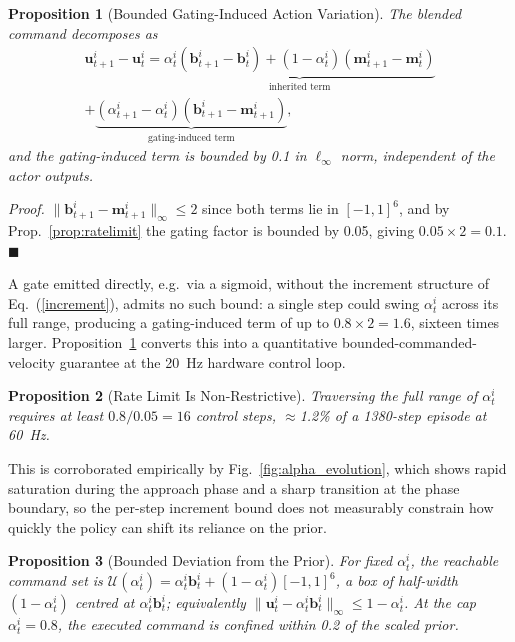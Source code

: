 \documentclass[a4paper,fleqn]{cas-dc}
\newtheorem{proposition}{Proposition}
\begin{document}
\begin{proposition}[Bounded Gating-Induced Action Variation]
\label{prop:actionvariation}
The blended command decomposes as
\begin{multline}
\mathbf{u}_{t+1}^i - \mathbf{u}_t^i = \underbrace{\alpha_t^i(\mathbf{b}_{t+1}^i - \mathbf{b}_t^i) + (1-\alpha_t^i)(\mathbf{m}_{t+1}^i - \mathbf{m}_t^i)}_{\text{inherited term}} \\
+ \underbrace{(\alpha_{t+1}^i - \alpha_t^i)(\mathbf{b}_{t+1}^i - \mathbf{m}_{t+1}^i)}_{\text{gating-induced term}},
\label{action_decomposition}
\end{multline}
and the gating-induced term is bounded by 0.1 in $\ell_\infty$ norm, independent of the actor outputs.
\end{proposition}
\textit{Proof.} $\|\mathbf{b}_{t+1}^i - \mathbf{m}_{t+1}^i\|_\infty \le 2$ since both terms lie in $[-1,1]^6$, and by Prop.~\ref{prop:ratelimit} the gating factor is bounded by 0.05, giving $0.05 \times 2 = 0.1$. $\blacksquare$

A gate emitted directly, e.g.\ via a sigmoid, without the increment structure of Eq.~(\ref{increment}), admits no such bound: a single step could swing $\alpha_t^i$ across its full range, producing a gating-induced term of up to $0.8 \times 2 = 1.6$, sixteen times larger. Proposition~\ref{prop:actionvariation} converts this into a quantitative bounded-commanded-velocity guarantee at the 20~Hz hardware control loop.

\begin{proposition}[Rate Limit Is Non-Restrictive]
\label{prop:nonrestrictive}
Traversing the full range of $\alpha_t^i$ requires at least $0.8/0.05 = 16$ control steps, $\approx$1.2\% of a 1380-step episode at 60~Hz.
\end{proposition}
This is corroborated empirically by Fig.~\ref{fig:alpha_evolution}, which shows rapid saturation during the approach phase and a sharp transition at the phase boundary, so the per-step increment bound does not measurably constrain how quickly the policy can shift its reliance on the prior.

\begin{proposition}[Bounded Deviation from the Prior]
\label{prop:boundeddeviation}
For fixed $\alpha_t^i$, the reachable command set is $\mathcal{U}(\alpha_t^i) = \alpha_t^i \mathbf{b}_t^i + (1-\alpha_t^i)[-1,1]^6$, a box of half-width $(1-\alpha_t^i)$ centred at $\alpha_t^i \mathbf{b}_t^i$; equivalently $\|\mathbf{u}_t^i - \alpha_t^i \mathbf{b}_t^i\|_\infty \le 1 - \alpha_t^i$. At the cap $\alpha_t^i=0.8$, the executed command is confined within 0.2 of the scaled prior.
\end{proposition}
\end{document}
